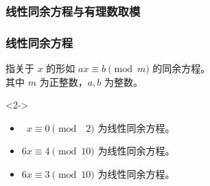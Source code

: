 \documentclass{../pkslide}
\begin{document}

\subsubsection{线性同余方程与有理数取模}


\begin{frame}
  \frametitle{线性同余方程}
  \begin{definition}
    指关于 $x$ 的形如 $a x \equiv b \pmod{m}$ 的同余方程。\\
    其中 $m$ 为正整数，$a, b$ 为整数。
  \end{definition}
  
  \begin{uncoverenv}<2->
    \begin{examples}[线性同余方程]
      \begin{itemize}
        \item $\phantom{1}x \equiv 0 \pmod{\phantom{0}2}$ 为线性同余方程。
        \item $6 x \equiv 4 \pmod{10}$ 为线性同余方程。
        \item $6 x \equiv 3 \pmod{10}$ 为线性同余方程。
      \end{itemize}
    \end{examples}
  \end{uncoverenv}
\end{frame}
\end{document}
